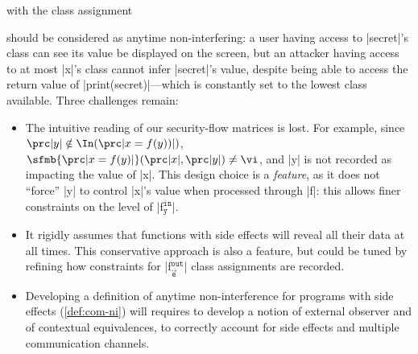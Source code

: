 \noindent
\begin{minipage}{.45\textwidth}
\noindent
\usebox\ifsecret
\end{minipage}
with the class assignment
\hspace{-4.15em}
\begin{minipage}{.37\textwidth}
\end{minipage}

\noindent should be considered as anytime non-interfering: a user having access to \prc|secret|'s class can see its value be displayed on the screen, but an attacker having access to at most \prc|x|'s class cannot infer \prc|secret|'s value, despite being able to access the return value of \prc|print(secret)|---which is constantly set to the lowest class available.
Three challenges remain:
\begin{itemize}
\item The intuitive reading of our security-flow matrices is lost. For example, since \(\prc|y| \notin \In(\prc|x = f(y))|)\), \(\sfmb{\prc|x = f(y)|}(\prc|x|, \prc|y|) \neq \vi\), and \prc|y| is not recorded as impacting the value of \prc|x|.
This design choice is a \emph{feature}, as it does not \enquote{force} \prc|y| to control \prc|x|'s value when processed through \prc|f|: this allows finer constraints on the level of \prc|f$^{\mathtt{in}}_{\mathtt{y}}$|. %
\item It rigidly assumes that functions with side effects will reveal all their data at all times. This conservative approach is also a feature, but could be tuned by refining how constraints for \prc|f$^{\mathtt{out}}_{\vec{\mathtt{e}}}$| class assignments are recorded.
\item Developing a definition of anytime non-interference for programs with side effects (\autoref{def:com-ni}) will requires to develop a notion of external observer and of contextual equivalences, to correctly account for side effects and multiple communication channels.
\end{itemize}

